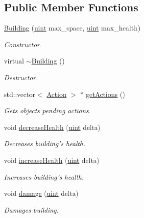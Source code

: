 \subsection*{Public Member Functions}
\begin{DoxyCompactItemize}
\item 
\hyperlink{classBuilding_a3db0a7481a8d811c00cc4b7f23cbc0e5}{Building} (\hyperlink{BasicTypes_8h_a91ad9478d81a7aaf2593e8d9c3d06a14}{uint} max\-\_\-space, \hyperlink{BasicTypes_8h_a91ad9478d81a7aaf2593e8d9c3d06a14}{uint} max\-\_\-health)
\begin{DoxyCompactList}\small\item\em Constructor. \end{DoxyCompactList}\item 
virtual \hyperlink{classBuilding_ab675c6a382e110b84031956cda708439}{$\sim$\-Building} ()
\begin{DoxyCompactList}\small\item\em Destructor. \end{DoxyCompactList}\item 
std\-::vector$<$ \hyperlink{classAction}{Action} $>$ $\ast$ \hyperlink{classBuilding_a2b0b464d1d8aa158729b5e2f1454ecdf}{get\-Actions} ()
\begin{DoxyCompactList}\small\item\em Gets objects pending actions. \end{DoxyCompactList}\item 
void \hyperlink{classBuilding_a5b97de4c4a379bcd8624aa2e6bfb1a3c}{decrease\-Health} (\hyperlink{BasicTypes_8h_a91ad9478d81a7aaf2593e8d9c3d06a14}{uint} delta)
\begin{DoxyCompactList}\small\item\em Decreases building's health. \end{DoxyCompactList}\item 
void \hyperlink{classBuilding_a3b373e84180fba24ba0afe981e550984}{increase\-Health} (\hyperlink{BasicTypes_8h_a91ad9478d81a7aaf2593e8d9c3d06a14}{uint} delta)
\begin{DoxyCompactList}\small\item\em Increases building's health. \end{DoxyCompactList}\item 
void \hyperlink{classBuilding_a6bb55b63a07e77ffea29316e8af400af}{damage} (\hyperlink{BasicTypes_8h_a91ad9478d81a7aaf2593e8d9c3d06a14}{uint} delta)
\begin{DoxyCompactList}\small\item\em Damages building. \end{DoxyCompactList}\item 

\end{DoxyCompactItemize}
